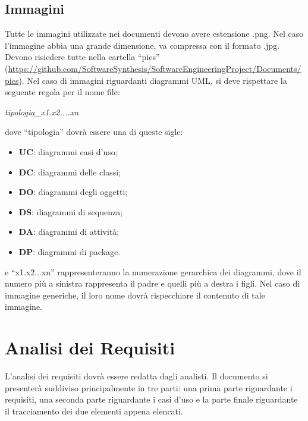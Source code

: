 \subsection{Immagini}
Tutte le immagini utilizzate nei documenti devono avere estensione .png. Nel caso l'immagine abbia una grande dimensione, va compressa con il formato .jpg. Devono risiedere tutte nella cartella ``pics'' (\url{https://github.com/SoftwareSynthesis/SoftwareEngineeringProject/Documents/pics}).
\newline
Nel caso di immagini riguardanti diagrammi UML, si deve rispettare la seguente regola per il nome file:
\begin{center}
\textit{tipologia\_x1.x2....xn}
\end{center}
dove ``tipologia'' dovrà essere una di queste sigle:
\begin{itemize}
\item \textbf{UC}: diagrammi casi d'uso;
\item \textbf{DC}: diagrammi delle classi;
\item \textbf{DO}: diagrammi degli oggetti;
\item \textbf{DS}: diagrammi di sequenza;
\item \textbf{DA}: diagrammi di attività;
\item \textbf{DP}: diagrammi di package.
\end{itemize}
e ``x1.x2...xn'' rappresenteranno la numerazione gerarchica dei diagrammi, dove il numero più a sinistra rappresenta il padre e quelli più a destra i figli.
\newline
Nel caso di immagine generiche, il loro nome dovrà rispecchiare il contenuto di tale immagine.

\newpage
\section{Analisi dei Requisiti}
L'analisi dei requisiti dovrà essere redatta dagli analisti. Il documento si presenterà suddiviso principalmente in tre parti: una prima parte riguardante i requisiti, una seconda parte riguardante i casi d'uso e la parte finale riguardante il tracciamento dei due elementi appena elencati.

